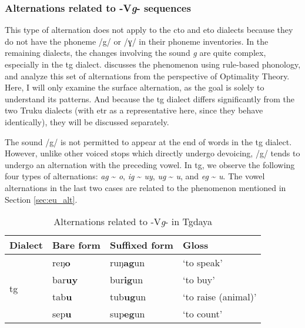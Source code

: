 \subsubsection{Alternations related to -V\textit{g}- sequences} \label{sec:Vg_alt}

This type of alternation does not apply to the \acl{cto} and \acl{eto} dialects because they do not have the phoneme /g/ or /ɣ/ in their phoneme inventories. In the remaining dialects, the changes involving the sound \textit{g} are quite complex, especially in the \acl{tg} dialect. \textcite[653-57]{yang1976sedpho} discusses the phenomenon using rule-based phonology, and \textcite{songandpan2024g} analyze this set of alternations from the perspective of Optimality Theory. Here, I will only examine the surface alternation, as the goal is solely to understand its patterns. And because the \acl{tg} dialect differs significantly from the two Truku dialects (with \acl{etr} as a representative here, since they behave identically), they will be discussed separately.

The sound /g/ is not permitted to appear at the end of words in the \acl{tg} dialect. However, unlike other voiced stops which directly undergo devoicing, /g/ tends to undergo an alternation with the preceding vowel. In \acl{tg}, we observe the following four types of alternations: \textit{ag} \~{ } \textit{o}, \textit{ig} \~{ } \textit{uy}, \textit{ug} \~{ } \textit{u}, and \textit{eg} \~{ } \textit{u}. The vowel alternations in the last two cases are related to the phenomenon mentioned in Section \ref{sec:eu_alt}.

\begin{table}[!htbp]
\centering
\caption{Alternations related to -V\textit{g}- in Tgdaya}
\label{tab:Vg_alt_tg}
\begin{tabular}{llll}
\hline
Dialect                   & Bare form      & Suffixed form    & Gloss      \\ \hline
\multirow{4}{*}{\acl{tg}} & reŋ\textbf{o}  & ruŋ\textbf{ag}un & `to speak'          \\
                          & bar\textbf{uy} & bur\textbf{ig}un & `to buy'            \\
                          & tab\textbf{u} & tub\textbf{ug}un & `to raise (animal)' \\
                          & sep\textbf{u} & sup\textbf{eg}un & `to count'          \\ \hline
\end{tabular}
\end{table}

